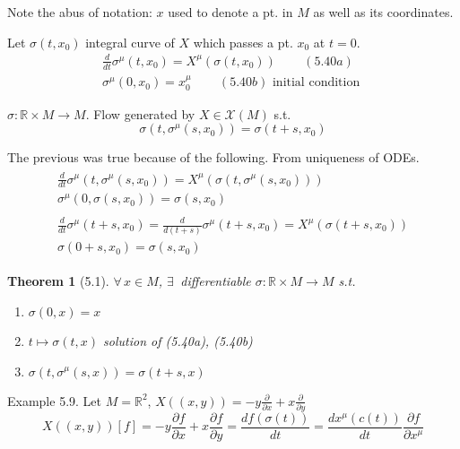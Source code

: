 \documentclass[twoside]{amsart}
\newtheorem{theorem}{Theorem}
\begin{document}
Note the abus of notation: $x$ used to denote a pt. in $M$ as well as its coordinates.  

Let $\sigma(t,x_0)$ integral curve of $X$ which passes a pt. $x_0$ at $t=0$.  
\begin{gather}
  \frac{d}{dt} \sigma^{\mu}(t,x_0) = X^{\mu}(\sigma(t,x_0)) \quad \quad \, (5.40a) \\ 
  \sigma^{\mu}(0, x_0) = x_0^{\mu} \quad \quad \, (5.40b) \text{ initial condition }
\end{gather}

$\sigma : \mathbb{R} \times M \to M$.  Flow generated by $X \in \mathcal{X}(M)$ s.t. 
\[
\sigma(t, \sigma^{\mu}(s,x_0) ) = \sigma( t+ s ,x_0)
\]

The previous was true because of the following.  From uniqueness of ODEs.
\[
\begin{gathered}
  \begin{gathered} 
    \frac{d}{dt} \sigma^{\mu}(t, \sigma^{\mu}(s,x_0) ) = X^{\mu}( \sigma(t, \sigma^{\mu}(s,x_0)) ) \\ 
    \sigma^{\mu}(0 , \sigma(s,x_0) ) = \sigma(s,x_0) \end{gathered} \\ 
  \begin{gathered}
    \frac{d}{dt} \sigma^{\mu}( t+ s ,x_0) = \frac{d}{d (t+s) } \sigma^{\mu}(t+s , x_0 ) = X^{\mu}(\sigma(t+s, x_0)) \\ 
    \sigma( 0 + s, x_0) = \sigma(s,x_0)
\end{gathered}
\end{gathered}
\]

\begin{theorem}[5.1] $\forall \, x \in M$, $\exists \, $ differentiable $\sigma: \mathbb{R} \times M \to M$ s.t. 
\begin{enumerate}
\item[(i)] $\sigma(0,x) = x$ 
\item[(ii)] $t \mapsto \sigma(t,x)$ solution of (5.40a), (5.40b) 
\item[(iii)] $\sigma(t, \sigma^{\mu}(s,x)) = \sigma(t+s,x)$
\end{enumerate}
\end{theorem}

Example 5.9. Let $M = \mathbb{R}^2$, $X((x,y)) = -y \frac{ \partial}{\partial x} + x \frac{ \partial }{ \partial y }$
\[
X((x,y))[f] = -y \frac{ \partial f}{ \partial x} + x \frac{ \partial f}{ \partial y } = \frac{df(\sigma(t)) }{ dt} = \frac{ dx^{\mu}(c(t)) }{ dt} \frac{ \partial f}{ \partial x^{\mu} }
\]
\end{document}
